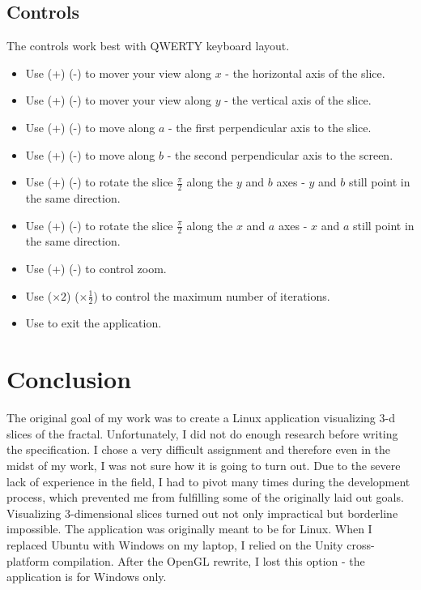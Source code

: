 \documentclass[11pt,a4paper,twoside,openright]{report}
\begin{document}
\section{Controls}
The controls work best with QWERTY keyboard layout.
\begin{itemize}
    \item Use (+) (-) to mover your view along $x$ - the horizontal axis of the slice.
     \item Use (+) (-) to mover your view along $y$ - the vertical axis of the slice.
    \item Use (+) (-) to move along $a$ - the first perpendicular axis to the slice.
    \item Use (+) (-) to move along $b$ - the second perpendicular axis to the screen.
    \item Use (+) (-) to rotate the slice $\frac{\pi}{2}$ along the $y$ and $b$ axes - $y$ and $b$ still point in the same direction.
    \item Use (+) (-) to rotate the slice $\frac{\pi}{2}$ along the $x$ and $a$ axes - $x$ and $a$ still point in the same direction.
    \item Use (+) (-) to control zoom.
    \item Use ($\times2$) ($\times \frac{1}{2}$) to control the maximum number of iterations.
    \item Use  to exit the application.
    
\end{itemize}


\chapter*{Conclusion}
\pagestyle{empty}
The original goal of my work was to create a Linux application visualizing 3-d slices of the fractal. Unfortunately, I did not do enough research before writing the specification. I chose a very difficult assignment and therefore even in the midst of my work, I was not sure how it is going to turn out. Due to the severe lack of experience in the field, I had to pivot many times during the development process, which prevented me from fulfilling some of the originally laid out goals. Visualizing 3-dimensional slices turned out not only impractical but borderline impossible. The application was originally meant to be for Linux. When I replaced Ubuntu with Windows on my laptop, I relied on the Unity cross-platform compilation. After the OpenGL rewrite, I lost this option - the application is for Windows only. 
\end{document}
